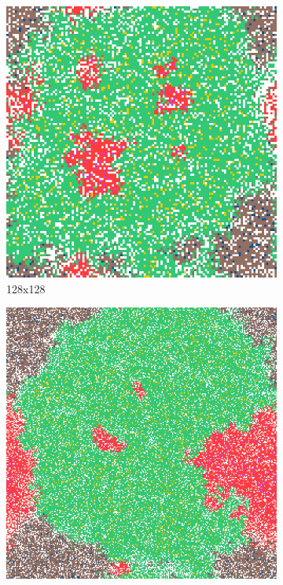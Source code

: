 \documentclass[\main/thesis.tex]{subfiles}
\begin{document}
\begin{figure}[H]
\begin{subfigure}[t]{.47\textwidth}
        \includegraphics[width=\textwidth]{images/3_GridSizeComparison/Fig1/2_128x128.jpeg}
        \caption{128x128}
        \label{fig:128x128TimeStep}
    \end{subfigure}
    \begin{subfigure}[t]{.47\textwidth}
        \centering
        \includegraphics[width=\textwidth]{images/3_GridSizeComparison/Fig1/3_256x256.jpeg}

\end{subfigure}
\end{figure}
\end{document}
